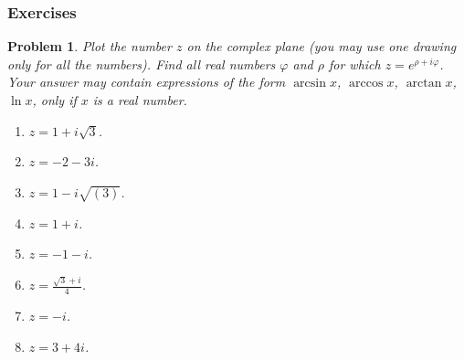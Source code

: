 \documentclass[12pt]{book}
\newtheorem{problem}{Problem}[section]
\begin{document}
\subsubsection{Exercises}
\begin{problem}\label{probComplexLogs}
Plot the number $z$ on the complex plane (you may use one drawing only for all the numbers). Find all real numbers $\varphi$ and $\rho$ for which $z=e^{\rho+i\varphi}$. Your answer may contain expressions of the form $\arcsin x$, $\arccos x$, $\arctan x$, $\ln x$, only if $x$ is a real number.
\begin{enumerate}
\item \label{prob1plussqrt3} $z=1+i\sqrt{3}$.
\item \label{prob2plus3i} $z=-2-3i$.
\item $z=1-i\sqrt{(3)}$.
\item $z=1+i$.
\item $z=-1-i$.
\item $z=\frac{\sqrt{3}+i}4$.
\item $z=-i$.
\item $z=3+4i$.
\end{enumerate}
\end{problem}
\end{document}
